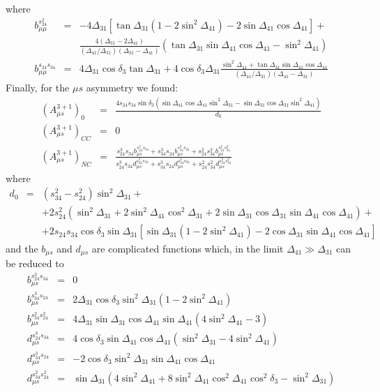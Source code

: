 \documentclass[12pt]{article}
\begin{document}
where
\begin{eqnarray}
 \nonumber b_{\mu\mu}^{s_{24}^2} &=&-4\Delta_{31}[\tan\Delta_{31}(1-2\sin^2\Delta_{41})-2\sin\Delta_{41}\cos\Delta_{41}]+\\
 & &\frac{4(\Delta_{31}-2\Delta_{41})}{(\Delta_{41}/\Delta_{31})(\Delta_{31}-\Delta_{41})}(\tan\Delta_{31}\sin\Delta_{41}\cos\Delta_{41}-\sin^2\Delta_{41})
 \\
 b_{\mu\mu}^{s_{24}s_{34}} &=&4\Delta_{31}\cos\delta_3\tan\Delta_{31}+4\cos\delta_3 \Delta_{31}\frac{\sin^2\Delta_{41}+\tan\Delta_{31}\sin\Delta_{41}\cos\Delta_{41}}{(\Delta_{41}/\Delta_{31})(\Delta_{41}-\Delta_{31})}
\end{eqnarray}
Finally, for the $\mu s$ asymmetry we found:
\begin{eqnarray}
 (A_{\mu s}^{3+1})_0 &=& \frac{4s_{24}s_{34}\sin\delta_3(\sin\Delta_{41}\cos\Delta_{41}\sin^2\Delta_{31}-\sin\Delta_{31}\cos\Delta_{31}\sin^2\Delta_{41})}{d_0} \nonumber \\
 (A_{\mu s}^{3+1})_{CC} &=& 0 \\
(A_{\mu s}^{3+1})_{NC} &=& \frac{s_{24}^3 s_{34} b_{\mu s}^{s_{24}^3s_{34}}+s_{34}^3s_{24}b_{\mu s}^{s_{34}^3s_{24}}+s_{24}^2s_{34}^2 b_{\mu s}^{s_{24}^2s_{34}^2} }{s_{24}^3 s_{34} d_{\mu s}^{s_{24}^3s_{34}}+s_{34}^3s_{24}d_{\mu s}^{s_{34}^3s_{24}}+s_{24}^2s_{34}^2 d_{\mu s}^{s_{24}^2s_{34}^2} }\nonumber\,
\end{eqnarray}
where
\begin{eqnarray}
\nonumber d_0&=&(s_{34}^2-s_{24}^2)\sin^2\Delta_{31}+\\
 \nonumber & &+2 s_{24}^2(\sin^2\Delta_{31}+2\sin^2\Delta_{41}\cos^2\Delta_{31}+2\sin\Delta_{31}\cos\Delta_{31}\sin\Delta_{41}\cos\Delta_{41})+\\
 & & +2s_{24}s_{34}\cos\delta_3 \sin\Delta_{31}[\sin\Delta_{31}(1-2\sin^2\Delta_{41})-2\cos\Delta_{31}\sin\Delta_{41}\cos\Delta_{41}]
\end{eqnarray}
and the $b_{\mu s}$ and $d_{\mu s}$ are complicated functions which, in the limit $\Delta_{41}\gg\Delta_{31}$ can be reduced to
\begin{eqnarray}
 \nonumber b_{\mu s}^{s_{24}^3s_{34}}& = & 0 \\
 \nonumber b_{\mu s}^{s_{34}^3s_{24}}& = & 2 \Delta_{31} \cos\delta_3 \sin^2\Delta_{31} (1-2\sin^2\Delta_{41}) \\
 \nonumber b_{\mu s}^{s_{34}^2s_{24}^2}& = & 4 \Delta_{31} \sin\Delta_{31}\cos\Delta_{41}\sin\Delta_{41} (4\sin^2\Delta_{41}-3) \\
 d_{\mu s}^{s_{24}^3s_{34}}& = & 4 \cos\delta_3\sin\Delta_{41}\cos\Delta_{41}(\sin^2\Delta_{31}-4\sin^2\Delta_{41})\\
 \nonumber d_{\mu s}^{s_{34}^3s_{24}}& = & -2 \cos\delta_3 \sin^2\Delta_{31}\sin\Delta_{41}\cos\Delta_{41} \\
 \nonumber d_{\mu s}^{s_{34}^2s_{24}^2}& = &  \sin\Delta_{31}(4\sin^2\Delta_{41}+8\sin^2\Delta_{41}\cos^2\Delta_{41}\cos^2\delta_3-\sin^2\Delta_{31})
\end{eqnarray}



\end{document}
